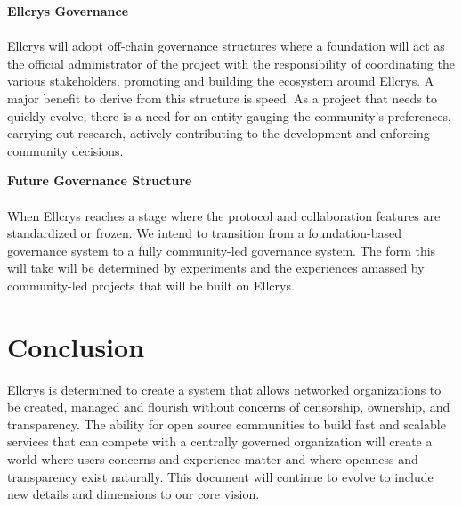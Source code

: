 \noindent
\textbf{Ellcrys Governance}\\\\
Ellcrys will adopt off-chain governance structures where a foundation will act as the official administrator of the project with the responsibility of coordinating the various stakeholders, promoting and building the ecosystem around Ellcrys. A major benefit to derive from this structure is speed. As a project that needs to quickly evolve, there is a need for an entity gauging the community’s preferences, carrying out research, actively contributing to the development and enforcing community decisions.

\noindent
\textbf{Future Governance Structure}\\\\
When Ellcrys reaches a stage where the protocol and collaboration features are standardized or frozen. We intend to transition from a foundation-based governance system to a fully community-led governance system. The form this will take will be determined by experiments and the experiences amassed by community-led projects that will be built on Ellcrys.

\section{Conclusion}
Ellcrys is determined to create a system that allows networked organizations to be created, managed and flourish without concerns of censorship, ownership, and transparency. The ability for open source communities to build fast and scalable services that can compete with a centrally governed organization will create a world where users concerns and experience matter and where openness and transparency exist naturally. This document will continue to evolve to include new details and dimensions to our core vision.











